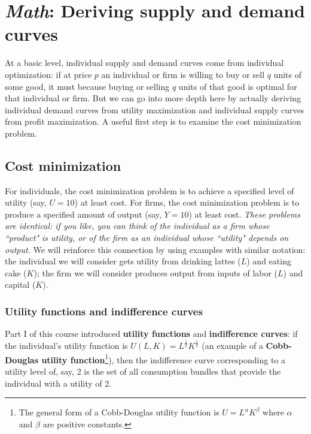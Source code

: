 

\chapter{\emph{Math}: Deriving supply and demand curves}
\label{3derive}

At a basic level, individual supply and demand curves come from individual optimization: if at price $p$ an individual or firm is willing to buy or sell $q$ units of some good, it must because buying or selling $q$ units of that good is optimal for that individual or firm. But we can go into more depth here by actually deriving individual demand curves from utility maximization and individual supply curves from profit maximization. A useful first step is to examine the cost minimization problem.

\section{Cost minimization}

For individuals, the cost minimization problem is to achieve a specified level of utility (say, $U=10$) at least cost. For firms, the cost minimization problem is to produce a specified amount of output (say, $Y=10$) at least cost. \emph{These problems are identical: if you like, you can think of the individual as a firm whose ``product" is utility, or of the firm as an individual whose ``utility" depends on output.} We will reinforce this connection by using examples with similar notation: the individual we will consider gets utility from drinking lattes ($L$) and eating cake ($K$); the firm we will consider produces output from inputs of labor ($L$) and capital ($K$).

\subsection*{Utility functions and indifference curves}

Part I of this course introduced \textbf{utility functions} and \textbf{indifference curves}: if the individual's utility function is $U(L, K)=L^{\frac{1}{2}}K^{\frac{1}{2}}$ (an example of a \textbf{Cobb-Douglas utility function}\footnote{The general form of a Cobb-Douglas utility function is $U=L^{\alpha}K^{\beta}$ where $\alpha$ and $\beta$ are positive constants.}), then the indifference curve corresponding to a utility level of, say, 2 is the set of all consumption bundles that provide the individual with a utility of 2.

